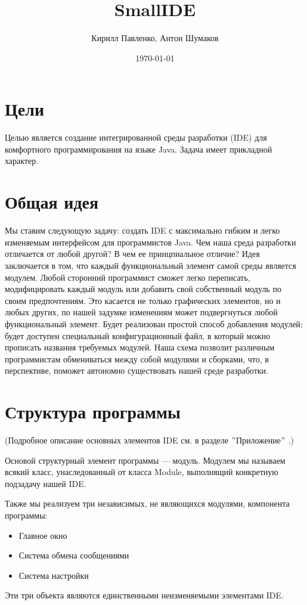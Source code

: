 \documentclass[12pt]{article}
\begin{document}
\title{SmallIDE}
\author{Кирилл Павленко, Антон Шумаков}
\date{\today}
\maketitle
\newpage

\section{Цели}
Целью является создание интегрированной среды разработки (IDE) для комфортного программирования на языке Java. Задача имеет прикладной характер.

\section{Общая идея}
Мы ставим следующую задачу: создать IDE с максимально гибким и легко изменяемым интерфейсом для программистов Java. Чем наша среда разработки отличается от любой другой? В чем ее принцпиальное отличие? Идея заключается в том, что каждый функциональный элемент самой среды является модулем. Любой сторонний программист сможет легко переписать, модифицировать каждый модуль или добавить свой собственный модуль по своим предпочтениям. Это касается не только графических элементов, но и любых других, по нашей задумке изменениям может подвергнуться любой функциональный элемент. Будет реализован простой способ добавления модулей; будет доступен специальный конфигурационный файл, в который можно прописать названия требуемых модулей. Наша схема позволит различным программистам обмениваться между собой модулями и сборками, что, в перспективе, поможет автономно существовать нашей среде разработки.

\section{Структура программы}

(Подробное описание основных элементов IDE см. в разделе $"$Приложение$"$ .)



Основой структурный элемент программы --- модуль. Модулем мы называем всякий класс, унаследованный от класса Module, выполнящий конкретную подзадачу нашей IDE.
 
Также мы реализуем три независимых, не являющихся модулями, компонента программы:
\begin{itemize}
\item Главное окно
\item Система обмена сообщениями
\item Система настройки
\end{itemize}
Эти три объекта являются единственными неизменяемыми элементами IDE. 
\end{document}
